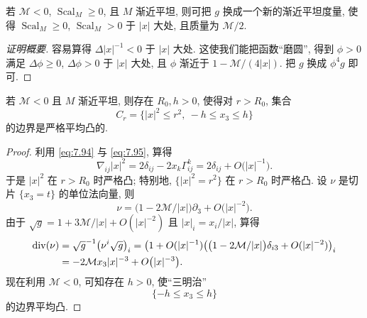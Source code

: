 \begin{lemma}
\label{lem:7.17}
若 $\mathcal{M}<0$, $\operatorname{Scal}_M\geq0$, 且 $M$ 渐近平坦, 则可把
$g$ 换成一个新的渐近平坦度量, 使得 $\operatorname{Scal}_M\geq0$,
$\operatorname{Scal}_M>0$ 于 $|x|$ 大处, 且质量为 $\mathcal{M}/2$.
\end{lemma}

\begin{proof}[证明概要]
容易算得 $\Delta|x|^{-1}<0$ 于 $|x|$ 大处. 这使我们能把函数``磨圆'',
得到 $\phi>0$ 满足 $\Delta\phi\geq0$, $\Delta\phi>0$ 于 $|x|$ 大处, 且
$\phi$ 渐近于 $1-\mathcal{M}/(4|x|)$. 把 $g$ 换成 $\phi^4g$ 即可.
\end{proof}

\begin{lemma}
\label{lem:7.18}
若 $\mathcal{M}<0$ 且 $M$ 渐近平坦, 则存在 $R_0,h>0$, 使得对 $r>R_0$,
集合
\begin{equation}
C_r=\bigl\{|x|^2\leq r^2,\ -h\leq x_3\leq h\bigr\}
\label{eq:7.97}
\end{equation}
的边界是严格平均凸的.
\end{lemma}

\begin{proof}
利用 \eqref{eq:7.94} 与 \eqref{eq:7.95}, 算得
\begin{equation}
\nabla_{ij}|x|^2=2\delta_{ij}-2x_k\Gamma_{ij}^k
=2\delta_{ij}+O\bigl(|x|^{-1}\bigr).
\label{eq:7.98}
\end{equation}
于是 $|x|^2$ 在 $r>R_0$ 时严格凸; 特别地, $\{|x|^2=r^2\}$ 在 $r>R_0$
时严格凸. 设 $\nu$ 是切片 $\{x_3=t\}$ 的单位法向量, 则
\begin{equation}
\nu=\bigl(1-2\mathcal{M}/|x|\bigr)\partial_3+O\bigl(|x|^{-2}\bigr).
\label{eq:7.99}
\end{equation}
由于 $\sqrt{g}=1+3\mathcal{M}/|x|+O(|x|^{-2})$ 且 $|x|_i=x_i/|x|$,
算得
\begin{equation}
\begin{aligned}
\operatorname{div}(\nu)&=\sqrt{g}^{-1}\bigl(\nu^i\sqrt{g}\bigr)_i
=\bigl(1+O(|x|^{-1})\bigl(\bigl(1-2\mathcal{M}/|x|\bigr)\delta_{i3}
+O(|x|^{-2})\bigr)_i\\
&=-2\mathcal{M}x_3|x|^{-3}+O\bigl(|x|^{-3}\bigr).
\end{aligned}
\label{eq:7.100}
\end{equation}
现在利用 $\mathcal{M}<0$, 可知存在 $h>0$, 使``三明治''
\begin{equation}
\{-h\leq x_3\leq h\}
\label{eq:7.101}
\end{equation}
的边界平均凸.
\end{proof}

